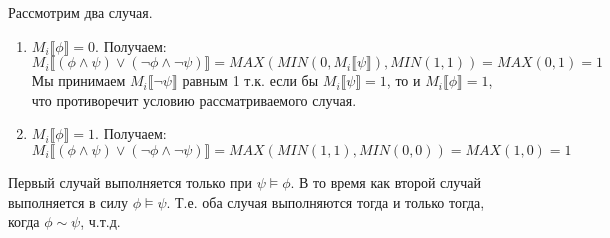 \documentclass{article}
\begin{document}
\begin{enumerate}
        Рассмотрим два случая.
        \begin{enumerate}
            \item
                \(M_i\llbracket \phi \rrbracket = 0\). Получаем:
                \[
                    M_i\llbracket (\phi \land \psi) \lor (\neg \phi \land \neg \psi) \rrbracket
                    = MAX(MIN(0, M_i\llbracket\psi\rrbracket), MIN(1, 1))
                    = MAX(0, 1)
                    = 1
                \]
                Мы принимаем \(M_i\llbracket\neg\psi\rrbracket\) равным 1 т.к. 
                если бы \(M_i\llbracket\psi\rrbracket = 1\), то и \(M_i\llbracket\phi\rrbracket = 1\), 
                что противоречит условию рассматриваемого случая.
            \item
                \(M_i\llbracket \phi \rrbracket = 1\). Получаем:
                \[
                    M_i\llbracket (\phi \land \psi) \lor (\neg \phi \land \neg \psi) \rrbracket
                    = MAX(MIN(1, 1), MIN(0, 0))
                    = MAX(1, 0)
                    = 1
                \]
        \end{enumerate}

        Первый случай выполняется только при \(\psi \models \phi\).
        В то время как второй случай выполняется в силу \(\phi \models \psi\).
        Т.е. оба случая выполняются тогда и только тогда, когда \(\phi \sim \psi\), ч.т.д.
\end{enumerate}
\end{document}

